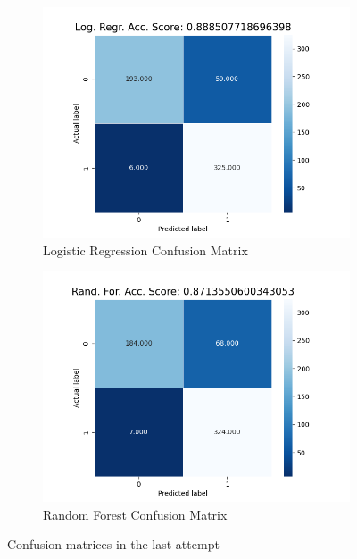 \documentclass[10pt, conference]{IEEEtran}
\begin{document}
\begin{figure}[t]
    \centering
    \begin{subfigure}[b]{.45\linewidth}
        \centering
        \includegraphics[width=\linewidth]{resources/confusion_matrix_in-out_features_bitrate_logreg.png}
        \caption{Logistic Regression Confusion Matrix}
        \label{fig:confusion-matrix-last-attempt-randfor}
    \end{subfigure}%
    \begin{subfigure}[b]{.45\linewidth}
        \centering
        \includegraphics[width=\linewidth]{resources/confusion_matrix_in-out_features_bitrate_randfor.png}
        \caption{Random Forest Confusion Matrix}
        \label{fig:confusion-matrix-last-attempt-logreg}
    \end{subfigure}
    \caption{Confusion matrices in the last attempt}
    \label{fig:confusion-matrix-last-attempt}
\end{figure}









\end{document}
